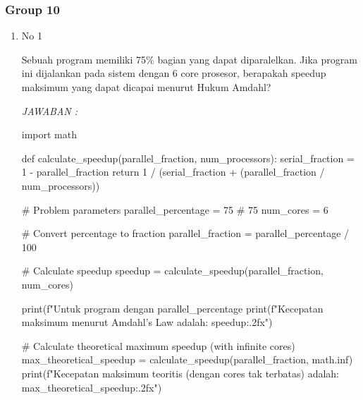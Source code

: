 \documentclass[12pt]{article}
\begin{document}
\subsubsection{Group 10}
\begin{enumerate}
    \item No 1

    Sebuah program memiliki 75\% bagian yang dapat diparalelkan. Jika program ini dijalankan pada sistem dengan 6 core prosesor, berapakah speedup maksimum yang dapat dicapai menurut Hukum Amdahl?

    \textit{JAWABAN : }
    \begin{python}
    import math

    def calculate_speedup(parallel_fraction, num_processors):
        serial_fraction = 1 - parallel_fraction
        return 1 / (serial_fraction + (parallel_fraction / num_processors))
    
    # Problem parameters
    parallel_percentage = 75  # 75%
    num_cores = 6
    
    # Convert percentage to fraction
    parallel_fraction = parallel_percentage / 100
    
    # Calculate speedup
    speedup = calculate_speedup(parallel_fraction, num_cores)
    
    print(f"Untuk program dengan {parallel_percentage}%
    print(f"Kecepatan maksimum menurut Amdahl's Law adalah: {speedup:.2f}x")
    
    # Calculate theoretical maximum speedup (with infinite cores)
    max_theoretical_speedup = calculate_speedup(parallel_fraction, math.inf)
    print(f"Kecepatan maksimum teoritis (dengan cores tak terbatas) adalah: {max_theoretical_speedup:.2f}x")
\end{python}


\end{enumerate}
\end{document}

